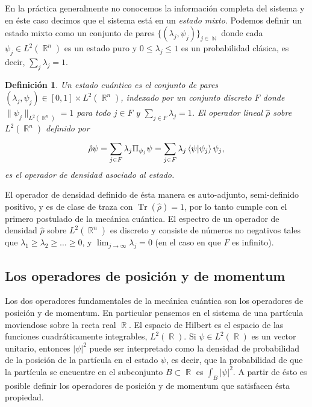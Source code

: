 \documentclass[a4paper]{report}
\DeclareMathOperator{\R}{\mathbb{R}}
\DeclareMathOperator{\N}{\mathbb{N}}
\DeclareMathOperator{\Tr}{Tr}
\newtheorem{definition}{Definición}
\begin{document}
  En la práctica generalmente no conocemos la
  información completa del sistema y en éste caso decimos
  que el sistema está en un \textit{estado mixto}. Podemos
  definir un estado mixto como un conjunto de pares
  $\{(\lambda_j,\psi_j)\}_{j \in \N}$ donde cada $\psi_j \in
  L^2(\R^{n})$ es un estado puro y $0 \leq \lambda_j \leq 1$
  es un probabilidad clásica, es decir, $\sum_j \lambda_j =
  1$.
  \begin{definition}
    Un estado cuántico es el conjunto de pares $(\lambda_j,
    \psi_j) \in [0,1] \times L^2(\R^{n})$, indexado por un
    conjunto discreto $F$ donde $\|\psi_j\|_{L^2(\R^{n})} =
    1$ para todo $j \in F$ y $\sum_{j \in F} \lambda_j = 1$.
    El operador lineal $\hat{\rho}$ sobre $L^2(\R^{n})$
    definido por
    \begin{equation}
      \hat{\rho} \psi
      = \sum_{j \in F}^{} \lambda_j \Pi_{\psi_j} \psi
      = \sum_{j \in F}^{} \lambda_j \braket{\psi| \psi_j}
      \psi_j,
    \end{equation}
    es el operador de densidad asociado al estado. 
  \end{definition}
  El operador de densidad definido de ésta manera es
  auto-adjunto, semi-definido positivo, y es de clase de
  traza con $\Tr(\hat{\rho}) = 1$, por lo tanto cumple con
  el primero postulado de la mecánica cuántica. El espectro
  de un operador de densidad $\hat{\rho}$ sobre
  $L^2(\R^{n})$ es discreto y consiste de números no
  negativos tales que $\lambda_1 \geq \lambda_2 \geq \ldots
  \geq 0$, y $\lim_{j \to \infty} \lambda_j = 0$ (en el caso
  en que $F$ es infinito).
  
  \subsection{Los operadores de posición y de momentum}

  Los dos operadores fundamentales de la mecánica cuántica
  son los operadores de posición y de momentum. En
  particular pensemos en el sistema de una partícula
  moviendose sobre la recta real $\R$. El espacio de Hilbert
  es el espacio de las funciones cuadráticamente
  integrables, $L^2(\R)$. Si $\psi \in L^2(\R)$ es un vector
  unitario, entonces $|\psi|^2$ puede ser interpretado como
  la densidad de probabilidad de la posición de la partícula
  en el estado $\psi$, es decir, que la probabilidad de que
  la partícula se encuentre en el subconjunto $B \subset \R$
  es $\int_B |\psi|^2$. A partir de ésto es posible definir
  los operadores de posición y de momentum que satisfacen
  ésta propiedad.
\end{document}
